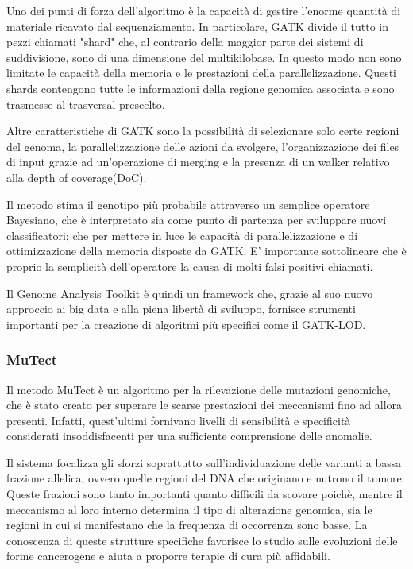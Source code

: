 Uno dei punti di forza dell'algoritmo è la capacità di gestire l'enorme quantità di materiale ricavato dal sequenziamento.
In particolare, GATK divide il tutto in pezzi chiamati "shard" che, al contrario della maggior parte dei sistemi di suddivisione, sono di una dimensione del multikilobase.
In questo modo non sono limitate le capacità della memoria e le prestazioni della parallelizzazione.
Questi shards contengono tutte le informazioni della regione genomica associata e sono trasmesse al trasversal prescelto.

Altre caratteristiche di GATK sono la possibilità di selezionare solo certe regioni del genoma, la parallelizzazione delle azioni da svolgere, l'organizzazione dei files di input grazie ad un'operazione di merging e la presenza di un walker relativo alla depth of coverage(DoC).

Il metodo stima il genotipo più probabile attraverso un semplice operatore Bayesiano, che è interpretato sia come punto di partenza per sviluppare nuovi classificatori; che per mettere in luce le capacità di parallelizzazione e di ottimizzazione della memoria disposte da GATK.
E' importante sottolineare che è proprio la semplicità dell'operatore la causa di molti falsi positivi chiamati.

Il Genome Analysis Toolkit è quindi un framework che, grazie al suo nuovo approccio ai big data e alla piena libertà di sviluppo, fornisce strumenti importanti per la creazione di algoritmi più specifici come il GATK-LOD.

\subsubsection{MuTect}
Il metodo MuTect è un algoritmo per la rilevazione delle mutazioni genomiche, che è stato creato per superare le scarse prestazioni dei meccanismi fino ad allora presenti.
Infatti, quest'ultimi fornivano livelli di sensibilità e specificità considerati insoddisfacenti per una sufficiente comprensione delle anomalie.

Il sistema focalizza gli sforzi soprattutto sull'individuazione delle varianti a bassa frazione allelica, ovvero quelle regioni del DNA che originano e nutrono il tumore.
Queste frazioni sono tanto importanti quanto difficili da scovare poichè, mentre il meccanismo al loro interno determina il tipo di alterazione genomica, sia le regioni in cui si manifestano che la frequenza di occorrenza sono basse.
La conoscenza di queste strutture specifiche favorisce lo studio sulle evoluzioni delle forme cancerogene e aiuta a proporre terapie di cura più affidabili.

